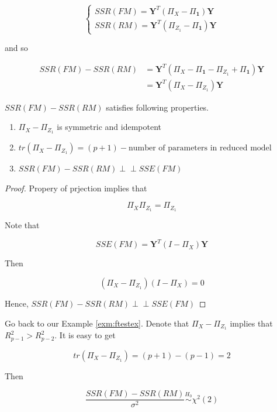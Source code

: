 \documentclass[]{book}
\theoremstyle{definition}
\theoremstyle{definition}
\theoremstyle{definition}
\theoremstyle{remark}
\let\BeginKnitrBlock\begin \let\EndKnitrBlock\end
\begin{document}
\begin{equation}
  \begin{cases}
    SSR(FM) = \mathbf{Y}^T (\Pi_X - \Pi_{\mathbf{1}}) \mathbf{Y} \\
    SSR(RM) = \mathbf{Y}^T (\Pi_{Z_1} - \Pi_{\mathbf{1}}) \mathbf{Y}
  \end{cases}
  \label{eq:ssrfmrm}
\end{equation}

and so

\begin{equation}
  \begin{split}
    SSR(FM) - SSR(RM) & = \mathbf{Y}^T (\Pi_X - \Pi_{\mathbf{1}} - \Pi_{Z_1} + \Pi_{\mathbf{1}}) \mathbf{Y} \\
    & = \mathbf{Y}^T (\Pi_X - \Pi_{Z_1}) \mathbf{Y}
  \end{split}
  \label{eq:fmrmstat}
\end{equation}

\BeginKnitrBlock{lemma}
\protect\hypertarget{lem:ssrfmlem}{}{\label{lem:ssrfmlem} }\(SSR(FM) - SSR(RM)\) satisfies following properties.

\begin{enumerate}
  \item $\Pi_X - \Pi_{Z_1}$ is symmetric and idempotent
  \item $tr(\Pi_X - \Pi_{Z_1}) = (p + 1) - \text{number of parameters in reduced model}$
  \item $SSR(FM) - SSR(RM) \perp\!\!\!\perp SSE(FM)$
\end{enumerate}
\EndKnitrBlock{lemma}

\BeginKnitrBlock{proof}
{}Propery of prjection implies that

\[\Pi_X \Pi_{Z_1} = \Pi_{Z_1}\]

Note that

\[SSE(FM) = \mathbf{Y}^T (I - \Pi_X) \mathbf{Y}\]

Then

\[(\Pi_X - \Pi_{Z_1})(I - \Pi_X) = 0\]

Hence, \(SSR(FM) - SSR(RM) \perp\!\!\!\perp SSE(FM)\)
\EndKnitrBlock{proof}

Go back to our Example \ref{exm:ftestex}. Denote that \(\Pi_X - \Pi_{Z_1}\) implies that \(R_{p - 1}^2 > R_{p - 2}^2\). It is easy to get

\[tr(\Pi_X - \Pi_{Z_1}) = (p + 1) - (p - 1) = 2\]

Then

\begin{equation}
  \frac{SSR(FM) - SSR(RM)}{\sigma^2} \stackrel{H_0}{\sim}\chi^2(2)
  \label{eq:ssrfmnull}
\end{equation}
\end{document}
